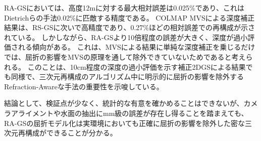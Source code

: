 RA-GSにおいては、高度12mに対する最大相対誤差は0.025\%であり、これはDietrichらの手法\cite{Dietrich2016_multi-angle-correction}0.02\%に匹敵する精度である。
COLMAP MVSによる深度補正結果は、RS-GSに次いで高精度であり、0.27\%ほどの相対誤差での再構成が示されている。
しかしながら、RA-GSより10倍程度の誤差が大きく、深度が過小評価される傾向がある。
これは、MVSによる結果に単純な深度補正を乗じるだけでは、屈折の影響をMVSの原理を通して除外できていないためであると考えられる。
このことは、10cm程度の深度の過小評価を示す補正2DGSによる結果でも同様で、三次元再構成のアルゴリズム中に明示的に屈折の影響を除外するRefraction-Awareな手法の重要性を示唆している。

結論として、検証点が少なく、統計的な有意を確かめることはできないが、カメラアライメントや水面の抽出にmm級の誤差が存在し得ることを踏まえても、RA-GSの屈折モデル化は実環境においても正確に屈折の影響を除外した密な三次元再構成ができることが分かる。



